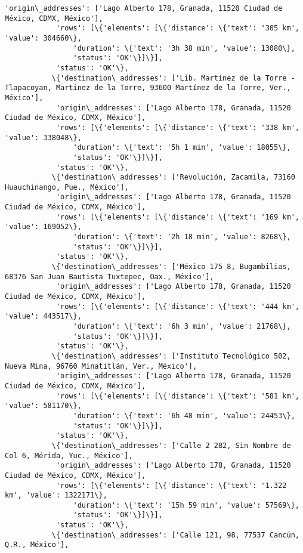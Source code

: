 \documentclass[11pt]{article}
\begin{document}
\begin{Verbatim}[commandchars=\\\{\}]
            'origin\_addresses': ['Lago Alberto 178, Granada, 11520 Ciudad de México, CDMX, México'],
            'rows': [\{'elements': [\{'distance': \{'text': '305 km', 'value': 304660\},
                'duration': \{'text': '3h 38 min', 'value': 13080\},
                'status': 'OK'\}]\}],
            'status': 'OK'\},
           \{'destination\_addresses': ['Lib. Martínez de la Torre - Tlapacoyan, Martinez de la Torre, 93600 Martínez de la Torre, Ver., México'],
            'origin\_addresses': ['Lago Alberto 178, Granada, 11520 Ciudad de México, CDMX, México'],
            'rows': [\{'elements': [\{'distance': \{'text': '338 km', 'value': 338048\},
                'duration': \{'text': '5h 1 min', 'value': 18055\},
                'status': 'OK'\}]\}],
            'status': 'OK'\},
           \{'destination\_addresses': ['Revolución, Zacamila, 73160 Huauchinango, Pue., México'],
            'origin\_addresses': ['Lago Alberto 178, Granada, 11520 Ciudad de México, CDMX, México'],
            'rows': [\{'elements': [\{'distance': \{'text': '169 km', 'value': 169052\},
                'duration': \{'text': '2h 18 min', 'value': 8268\},
                'status': 'OK'\}]\}],
            'status': 'OK'\},
           \{'destination\_addresses': ['México 175 8, Bugambilias, 68376 San Juan Bautista Tuxtepec, Oax., México'],
            'origin\_addresses': ['Lago Alberto 178, Granada, 11520 Ciudad de México, CDMX, México'],
            'rows': [\{'elements': [\{'distance': \{'text': '444 km', 'value': 443517\},
                'duration': \{'text': '6h 3 min', 'value': 21768\},
                'status': 'OK'\}]\}],
            'status': 'OK'\},
           \{'destination\_addresses': ['Instituto Tecnológico 502, Nueva Mina, 96760 Minatitlán, Ver., México'],
            'origin\_addresses': ['Lago Alberto 178, Granada, 11520 Ciudad de México, CDMX, México'],
            'rows': [\{'elements': [\{'distance': \{'text': '581 km', 'value': 581170\},
                'duration': \{'text': '6h 48 min', 'value': 24453\},
                'status': 'OK'\}]\}],
            'status': 'OK'\},
           \{'destination\_addresses': ['Calle 2 282, Sin Nombre de Col 6, Mérida, Yuc., México'],
            'origin\_addresses': ['Lago Alberto 178, Granada, 11520 Ciudad de México, CDMX, México'],
            'rows': [\{'elements': [\{'distance': \{'text': '1.322 km', 'value': 1322171\},
                'duration': \{'text': '15h 59 min', 'value': 57569\},
                'status': 'OK'\}]\}],
            'status': 'OK'\},
           \{'destination\_addresses': ['Calle 121, 98, 77537 Cancún, Q.R., México'],

\end{Verbatim}
\end{document}
